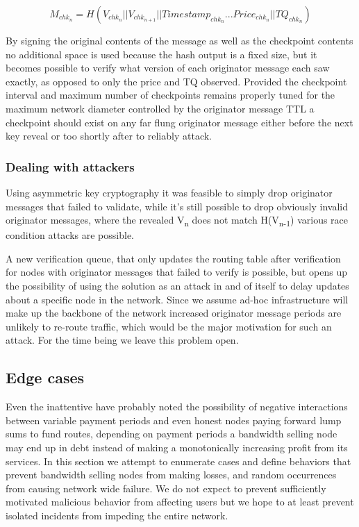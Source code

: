 \documentclass[11pt]{article}
\begin{document}
                        \[M_{chk_n} = H(V_{chk_n}||V_{chk_{n+1}}||Timestamp_{chk_n}...Price_{chk_n}||TQ_{chk_n})\]
                        
                        By signing the original contents of the message as well as the checkpoint contents no additional space is used because the hash output is a fixed size, but it becomes possible to verify what version of each originator message each saw exactly, as opposed to only the price and TQ observed. Provided the checkpoint interval and maximum number of checkpoints remains properly tuned for the maximum network diameter controlled by the originator message TTL a checkpoint should exist on any far flung originator message either before the next key reveal or too shortly after to reliably attack. 
                        
               \subsubsection{Dealing with attackers}
               
                          Using asymmetric key cryptography it was feasible to simply drop originator messages that failed to validate, while it's still possible to drop obviously invalid originator messages, where the revealed V\textsubscript{n} does not match H(V\textsubscript{n-1}) various race condition attacks are possible. 
                          
                          A new verification queue, that only updates the routing table after verification for nodes with originator messages that failed to verify is possible, but opens up the possibility of using the solution as an attack in and of itself to delay updates about a specific node in the network. Since we assume ad-hoc infrastructure will make up the backbone of the network increased originator message periods are unlikely to re-route traffic, which would be the major motivation for such an attack. For the time being we leave this problem open.
                

	\subsection{Edge cases}
               Even the inattentive have probably noted the possibility of negative interactions between variable payment periods and even honest nodes paying forward lump sums to fund routes, depending on payment periods a bandwidth selling node may end up in debt instead of making a monotonically increasing profit from its services. In this section we attempt to enumerate cases and define behaviors that prevent bandwidth selling nodes from making losses, and random occurrences from causing network wide failure. We do not expect to prevent sufficiently motivated malicious behavior from affecting users but we hope to at least prevent isolated incidents from impeding the entire network.
\end{document}
